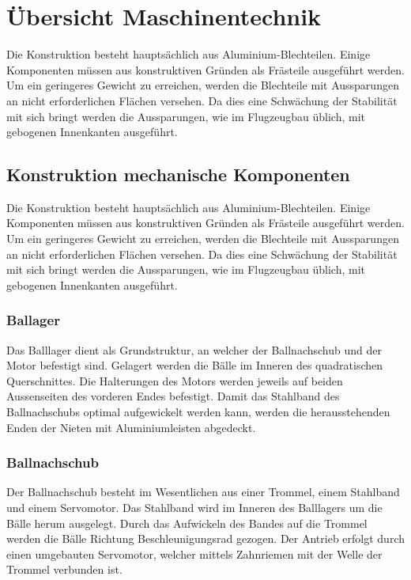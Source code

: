 \section{Übersicht Maschinentechnik}
Die Konstruktion besteht hauptsächlich aus Aluminium-Blechteilen. Einige Komponenten müssen aus konstruktiven Gründen als Frästeile ausgeführt werden.
Um ein geringeres Gewicht zu erreichen, werden die Blechteile mit Aussparungen an nicht erforderlichen Flächen versehen. Da dies eine Schwächung der Stabilität mit sich bringt werden die Aussparungen, wie im Flugzeugbau üblich, mit gebogenen Innenkanten ausgeführt. 

\subsection{Konstruktion mechanische Komponenten}
Die Konstruktion besteht hauptsächlich aus Aluminium-Blechteilen. Einige 
Komponenten müssen aus konstruktiven Gründen als Frästeile ausgeführt werden.
Um ein geringeres Gewicht zu 
erreichen, werden die Blechteile mit Aussparungen an nicht erforderlichen 
Flächen versehen. Da dies eine Schwächung der Stabilität mit sich bringt werden die Aussparungen, wie im Flugzeugbau üblich, mit gebogenen Innenkanten ausgeführt.

\subsubsection{Ballager}
Das Balllager dient als Grundstruktur, an welcher der Ballnachschub und der Motor befestigt sind. Gelagert werden die Bälle im Inneren des quadratischen Querschnittes. Die Halterungen des Motors werden jeweils auf beiden Aussenseiten des vorderen Endes befestigt. Damit das Stahlband des Ballnachschubs optimal aufgewickelt werden kann, werden die herausstehenden Enden der Nieten mit Aluminiumleisten abgedeckt.

\subsubsection{Ballnachschub}
Der Ballnachschub besteht im Wesentlichen aus einer Trommel, einem Stahlband und einem Servomotor. Das Stahlband wird im Inneren des Balllagers um die Bälle herum ausgelegt. Durch das Aufwickeln des Bandes auf die Trommel werden die Bälle Richtung Beschleunigungsrad gezogen. Der Antrieb erfolgt durch einen umgebauten Servomotor, welcher mittels Zahnriemen mit der Welle der Trommel verbunden ist.
